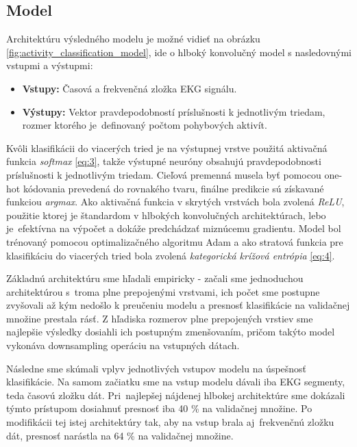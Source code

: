 \subsection{Model}

Architektúru výsledného modelu je možné vidieť na obrázku \ref{fig:activity_classification_model}, ide o hlboký konvolučný model s nasledovnými vstupmi a výstupmi:
\begin{itemize}
    \item \textbf{Vstupy:} Časová a frekvenčná zložka EKG signálu.
    \item \textbf{Výstupy:} Vektor pravdepodobností príslušnosti k jednotlivým triedam, rozmer ktorého je~definovaný počtom pohybových aktivít.
\end{itemize}

Kvôli klasifikácii do viacerých tried je na výstupnej vrstve použitá aktivačná funkcia \textit{softmax} \ref{eq:3}, takže výstupné neuróny obsahujú pravdepodobnosti príslušnosti k jednotlivým triedam. Cieľová premenná musela byť pomocou one-hot kódovania prevedená do rovnakého tvaru, finálne predikcie sú získavané funkciou \textit{argmax}. Ako aktivačná funkcia v skrytých vrstvách bola zvolená \textit{ReLU}, použitie ktorej je štandardom v hlbokých konvolučných architektúrach, lebo je~efektívna na výpočet a dokáže predchádzať miznúcemu gradientu. Model bol trénovaný pomocou optimalizačného algoritmu Adam a ako stratová funkcia pre klasifikáciu do viacerých tried bola zvolená \textit{kategorická krížová entrópia} \ref{eq:4}.

Základnú architektúru sme hľadali empiricky - začali sme jednoduchou architektúrou s~troma plne prepojenými vrstvami, ich počet sme postupne zvyšovali až kým nedošlo k preučeniu modelu a presnosť klasifikácie na validačnej množine prestala rásť. Z hľadiska rozmerov plne prepojených vrstiev sme najlepšie výsledky dosiahli ich postupným zmenšovaním, pričom takýto model vykonáva downsampling operáciu na vstupných dátach.

Následne sme skúmali vplyv jednotlivých vstupov modelu na úspešnosť klasifikácie. Na samom začiatku sme na vstup modelu dávali iba EKG segmenty, teda časovú zložku dát. Pri~najlepšej nájdenej hlbokej architektúre sme dokázali týmto prístupom dosiahnuť presnosť iba 40 \% na validačnej množine. Po modifikácii tej istej architektúry tak, aby na vstup brala aj~frekvenčnú zložku dát, presnosť narástla na 64 \% na validačnej množine. 


